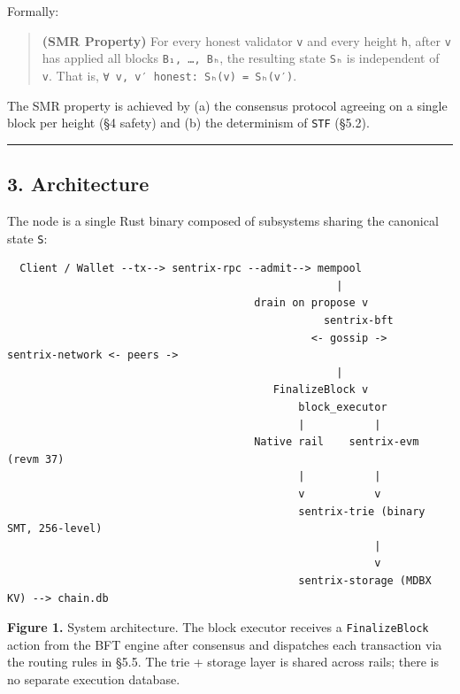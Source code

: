 \documentclass[11pt,a4paper]{article}
\newenvironment{Shaded}{}{}
\begin{document}
Formally:

\begin{quote}
\textbf{(SMR Property)} For every honest validator \texttt{v} and every
height \texttt{h}, after \texttt{v} has applied all blocks
\texttt{B₁,\ …,\ Bₕ}, the resulting state \texttt{Sₕ} is independent of
\texttt{v}. That is, \texttt{∀\ v,\ v′\ honest:\ Sₕ(v)\ =\ Sₕ(v′)}.
\end{quote}

The SMR property is achieved by (a) the consensus protocol agreeing on a
single block per height (§4 safety) and (b) the determinism of
\texttt{STF} (§5.2).

\begin{center}\rule{0.5\linewidth}{0.5pt}\end{center}

\hypertarget{3-architecture}{%
\subsection{3. Architecture}\label{3-architecture}}

The node is a single Rust binary composed of subsystems sharing the
canonical state \texttt{S}:

\begin{Shaded}
\begin{verbatim}
  Client / Wallet --tx--> sentrix-rpc --admit--> mempool
                                                    |
                                       drain on propose v
                                                  sentrix-bft
                                                <- gossip ->   sentrix-network <- peers ->
                                                    |
                                          FinalizeBlock v
                                              block_executor
                                              |           |
                                       Native rail    sentrix-evm (revm 37)
                                              |           |
                                              v           v
                                              sentrix-trie (binary SMT, 256-level)
                                                          |
                                                          v
                                              sentrix-storage (MDBX KV) --> chain.db
\end{verbatim}
\end{Shaded}

\textbf{Figure 1.} System architecture. The block executor receives a
\texttt{FinalizeBlock} action from the BFT engine after consensus and
dispatches each transaction via the routing rules in §5.5. The trie +
storage layer is shared across rails; there is no separate execution
database.
\end{document}
